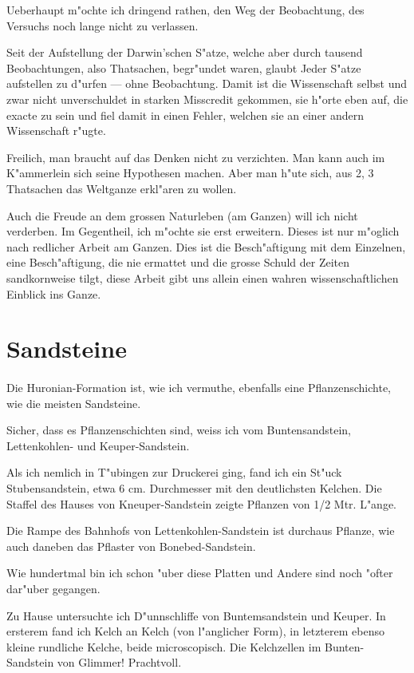 \documentclass[a4paper, 11pt, oneside, german]{article}
\begin{document}
Ueberhaupt m"ochte ich dringend rathen, den Weg der Beobachtung, des Versuchs noch lange nicht zu verlassen.

Seit der Aufstellung der Darwin'schen S"atze, welche aber durch tausend Beobachtungen, also Thatsachen, begr"undet waren, glaubt Jeder S"atze aufstellen zu d"urfen --- ohne Beobachtung. Damit ist die Wissenschaft selbst und zwar nicht unverschuldet in starken Misscredit gekommen, sie h"orte eben auf, die exacte zu sein und fiel damit in einen Fehler, welchen sie an einer andern Wissenschaft r"ugte.

Freilich, man braucht auf das Denken nicht zu verzichten. Man kann auch im K"ammerlein sich seine Hypothesen machen. Aber man h"ute sich, aus 2, 3 Thatsachen das Weltganze erkl"aren zu wollen.

Auch die Freude an dem grossen Naturleben (am Ganzen) will ich nicht verderben. Im Gegentheil, ich m"ochte sie erst erweitern. Dieses ist nur m"oglich nach redlicher Arbeit am Ganzen. Dies ist die Besch"aftigung mit dem Einzelnen, eine Besch"aftigung, die nie ermattet und die grosse Schuld der Zeiten sandkornweise tilgt, diese Arbeit gibt uns allein einen wahren wissenschaftlichen Einblick ins Ganze.
\clearpage
\section{Sandsteine}
\paragraph{}
Die Huronian-Formation ist, wie ich vermuthe, ebenfalls eine Pflanzenschichte, wie die meisten Sandsteine.

Sicher, dass es Pflanzenschichten sind, weiss ich vom Buntensandstein, Lettenkohlen- und Keuper-Sandstein.

Als ich nemlich in T"ubingen zur Druckerei ging, fand ich ein St"uck Stubensandstein, etwa 6 cm. Durchmesser mit den deutlichsten Kelchen. Die Staffel des Hauses von Kneuper-Sandstein zeigte Pflanzen von 1/2 Mtr. L"ange.

Die Rampe des Bahnhofs von Lettenkohlen-Sandstein ist durchaus Pflanze, wie auch daneben das Pflaster von Bonebed-Sandstein.

Wie hundertmal bin ich schon "uber diese Platten und Andere sind noch "ofter dar"uber gegangen.

Zu Hause untersuchte ich D"unnschliffe von Buntemsandstein und Keuper. In ersterem fand ich Kelch an Kelch (von l"anglicher Form), in letzterem ebenso kleine rundliche Kelche, beide microscopisch. Die Kelchzellen im Bunten-Sandstein von Glimmer! Prachtvoll.
\end{document}
